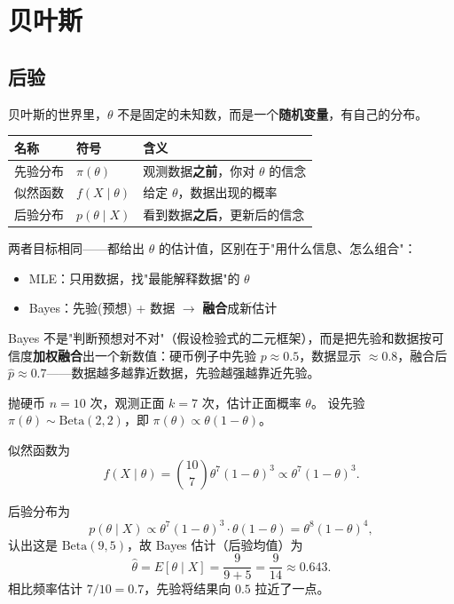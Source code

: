 \section{贝叶斯}
\subsection{后验}
\begin{note}
贝叶斯的世界里，$\theta$ 不是固定的未知数，而是一个\textbf{随机变量}，有自己的分布。

\begin{table}[h]
\centering
\begin{tabular}{lll}
\toprule
\textbf{名称} & \textbf{符号} & \textbf{含义} \\
\midrule
先验分布 & $\pi(\theta)$ & 观测数据\textbf{之前}，你对 $\theta$ 的信念 \\
似然函数 & $f(X\mid\theta)$ & 给定 $\theta$，数据出现的概率 \\
后验分布 & $p(\theta\mid X)$ & 看到数据\textbf{之后}，更新后的信念 \\
\bottomrule
\end{tabular}
\end{table}
\end{note}
\begin{note}
两者目标相同——都给出 $\theta$ 的估计值，区别在于"用什么信息、怎么组合"：
\begin{itemize}
  \item MLE：只用数据，找"最能解释数据"的 $\theta$
  \item Bayes：先验(预想) + 数据 $\to$ \textbf{融合}成新估计
\end{itemize}

Bayes 不是"判断预想对不对"（假设检验式的二元框架），而是把先验和数据按可信度\textbf{加权融合}出一个新数值：硬币例子中先验 $p\approx0.5$，数据显示 $\approx0.8$，融合后 $\hat p\approx0.7$——数据越多越靠近数据，先验越强越靠近先验。
\end{note}
\begin{example}
抛硬币 $n=10$ 次，观测正面 $k=7$ 次，估计正面概率 $\theta$。
设先验 $\pi(\theta)\sim\mathrm{Beta}(2,2)$，即 $\pi(\theta)\propto\theta(1-\theta)$。

似然函数为
\[
f(X\mid\theta)=\binom{10}{7}\theta^7(1-\theta)^3\propto\theta^7(1-\theta)^3.
\]

后验分布为
\[
p(\theta\mid X)\propto\theta^7(1-\theta)^3\cdot\theta(1-\theta)=\theta^8(1-\theta)^4,
\]
认出这是 $\mathrm{Beta}(9,5)$，故 Bayes 估计（后验均值）为
\[
\hat{\theta}=E[\theta\mid X]=\frac{9}{9+5}=\frac{9}{14}\approx 0.643.
\]
相比频率估计 $7/10=0.7$，先验将结果向 $0.5$ 拉近了一点。
\end{example}

